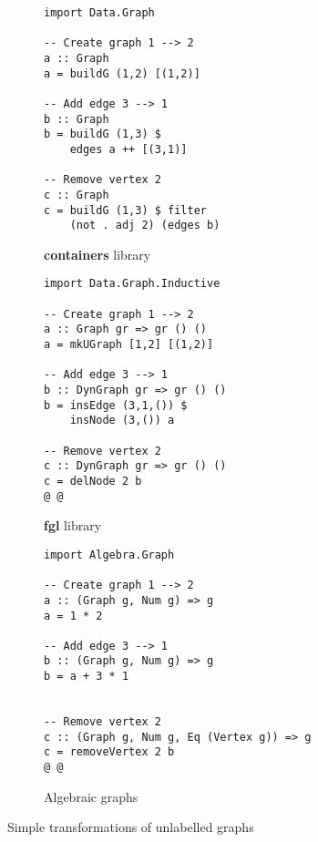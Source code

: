 \documentclass[acmlarge,anonymous]{acmart}\settopmatter{printfolios=true}
\begin{document}
\begin{figure}
\hspace{-2mm}
\begin{subfigure}[b]{0.24\linewidth}
\begin{verbatim}
import Data.Graph

-- Create graph 1 --> 2
a :: Graph
a = buildG (1,2) [(1,2)]

-- Add edge 3 --> 1
b :: Graph
b = buildG (1,3) $
    edges a ++ [(3,1)]

-- Remove vertex 2
c :: Graph
c = buildG (1,3) $ filter
    (not . adj 2) (edges b)
\end{verbatim}
\caption{\textbf{\textsf{containers}} library}
\end{subfigure}
\hfill
\hfill
\vrule
\hfill
\begin{subfigure}[b]{0.26\linewidth}
\begin{verbatim}
import Data.Graph.Inductive

-- Create graph 1 --> 2
a :: Graph gr => gr () ()
a = mkUGraph [1,2] [(1,2)]

-- Add edge 3 --> 1
b :: DynGraph gr => gr () ()
b = insEdge (3,1,()) $
    insNode (3,()) a

-- Remove vertex 2
c :: DynGraph gr => gr () ()
c = delNode 2 b
@ @
\end{verbatim}
\caption{\textbf{\textsf{fgl}} library}
\end{subfigure}
\hfill
\hfill
\vrule
\hfill
\begin{subfigure}[b]{0.4\linewidth}
\begin{verbatim}
import Algebra.Graph

-- Create graph 1 --> 2
a :: (Graph g, Num g) => g
a = 1 * 2

-- Add edge 3 --> 1
b :: (Graph g, Num g) => g
b = a + 3 * 1


-- Remove vertex 2
c :: (Graph g, Num g, Eq (Vertex g)) => g
c = removeVertex 2 b
@ @
\end{verbatim}
\caption{Algebraic graphs}
\end{subfigure}
\caption{Simple transformations of unlabelled graphs\label{fig-example}}
\end{figure}


\end{document}
